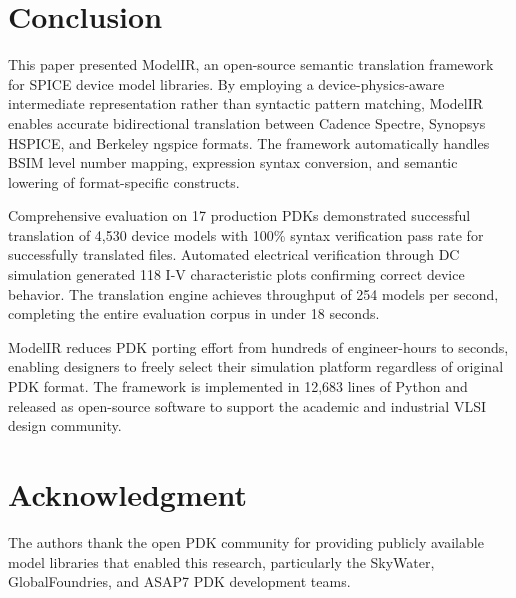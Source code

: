 \documentclass[conference]{IEEEtran}
\begin{document}
\section{Conclusion}
\label{sec:conclusion}

This paper presented ModelIR, an open-source semantic translation framework for SPICE device model libraries. By employing a device-physics-aware intermediate representation rather than syntactic pattern matching, ModelIR enables accurate bidirectional translation between Cadence Spectre, Synopsys HSPICE, and Berkeley ngspice formats. The framework automatically handles BSIM level number mapping, expression syntax conversion, and semantic lowering of format-specific constructs.

Comprehensive evaluation on 17 production PDKs demonstrated successful translation of 4,530 device models with 100\% syntax verification pass rate for successfully translated files. Automated electrical verification through DC simulation generated 118 I-V characteristic plots confirming correct device behavior. The translation engine achieves throughput of 254 models per second, completing the entire evaluation corpus in under 18 seconds.

ModelIR reduces PDK porting effort from hundreds of engineer-hours to seconds, enabling designers to freely select their simulation platform regardless of original PDK format. The framework is implemented in 12,683 lines of Python and released as open-source software to support the academic and industrial VLSI design community.

\section*{Acknowledgment}

The authors thank the open PDK community for providing publicly available model libraries that enabled this research, particularly the SkyWater, GlobalFoundries, and ASAP7 PDK development teams.
\end{document}
